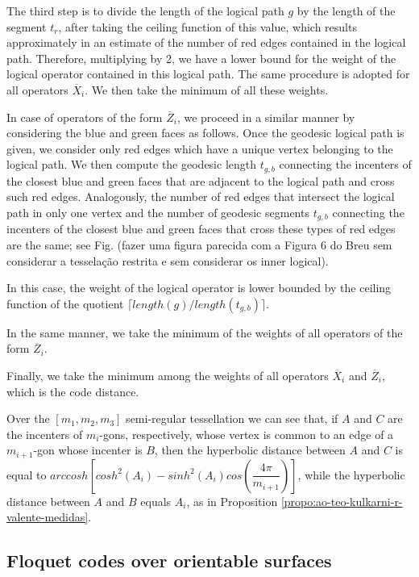 \documentclass[%
reprint,
amsmath,amssymb,
aps,
]{revtex4-2}
\begin{document}
The third step is to divide the length of the logical path $g$ by the length of the segment $t_{r}$, after taking the ceiling function of this value, 
which results approximately in an estimate of the number of red edges contained in the logical path. Therefore, multiplying by 2, we have a lower bound for the weight of the logical operator contained in this logical path. The same procedure is adopted for all operators ${\overline{X}}_{i}$. We then take the minimum of all these weights.

In case of operators of the form ${\overline{Z}}_{i}$, we proceed in a similar manner by considering the blue and green faces as follows. Once the geodesic logical path is given, we consider only red edges which have a unique vertex belonging to the logical path. We then compute the geodesic length $t_{g, b}$ connecting the incenters of the closest blue and green faces that are adjacent to the logical path and cross such red edges. Analogously, the number of red edges that intersect the logical path in only one vertex and the number of geodesic segments $t_{g, b}$ connecting the incenters of the closest blue and green faces that cross these types of red edges are the same; see Fig. (fazer uma figura parecida com a Figura 6 do Breu sem considerar a tesselação restrita e sem considerar os inner logical). 

In this case, the weight of the logical operator is lower bounded by the ceiling function of the quotient $\displaystyle \lceil length(g)/length (t_{g, b})\rceil$.

In the same manner, we take the minimum of the weights of all operators of the form ${\overline{Z}}_{i}$. 

Finally, we take the minimum among the weights of all operators ${\overline{X}}_{i}$ and ${\overline{Z}}_{i}$, which is the code distance.

Over the $[m_1, m_2, m_3]$ semi-regular tessellation we can see that, if $A$ and $C$ are the incenters of $m_i$-gons, respectively, whose vertex is common to an edge of a $m_{i+1}$-gon whose incenter is $B$, then the hyperbolic distance between $A$ and $C$ is equal to $arccosh\left[ cosh^2(A_i)-sinh^2(A_i)cos(\dfrac{4\pi}{m_{i+1}}) \right] $, while the hyperbolic distance between $A$ and $B$ equals $A_i$, as in Proposition \ref{propo:ao-teo-kulkarni-r-valente-medidas}.

\subsection{Floquet codes over orientable surfaces}\label{subOFloquet}
\end{document}
